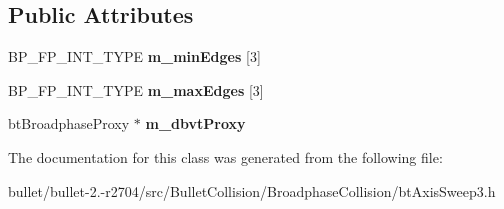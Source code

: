 \subsection*{Public Attributes}
\begin{DoxyCompactItemize}
\item 
\hypertarget{classbt_axis_sweep3_internal_1_1_handle_ac92cbc61a810b16834d8a57b1aca2918}{B\+P\+\_\+\+F\+P\+\_\+\+I\+N\+T\+\_\+\+T\+Y\+P\+E {\bfseries m\+\_\+min\+Edges} \mbox{[}3\mbox{]}}\label{classbt_axis_sweep3_internal_1_1_handle_ac92cbc61a810b16834d8a57b1aca2918}

\item 
\hypertarget{classbt_axis_sweep3_internal_1_1_handle_aae6803386536cfa8a80b0f9e535f8a01}{B\+P\+\_\+\+F\+P\+\_\+\+I\+N\+T\+\_\+\+T\+Y\+P\+E {\bfseries m\+\_\+max\+Edges} \mbox{[}3\mbox{]}}\label{classbt_axis_sweep3_internal_1_1_handle_aae6803386536cfa8a80b0f9e535f8a01}

\item 
\hypertarget{classbt_axis_sweep3_internal_1_1_handle_a8316a57f7dca9a06f3568acf5180e99e}{bt\+Broadphase\+Proxy $\ast$ {\bfseries m\+\_\+dbvt\+Proxy}}\label{classbt_axis_sweep3_internal_1_1_handle_a8316a57f7dca9a06f3568acf5180e99e}

\end{DoxyCompactItemize}


The documentation for this class was generated from the following file\+:\begin{DoxyCompactItemize}
\item 
bullet/bullet-\/2.-\/r2704/src/\+Bullet\+Collision/\+Broadphase\+Collision/bt\+Axis\+Sweep3.\+h\end{DoxyCompactItemize}
